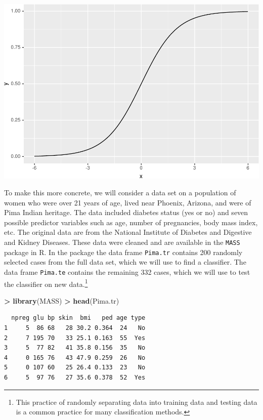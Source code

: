 \documentclass[]{krantz}
\makeatletter
\newenvironment{Shaded}{\begin{snugshade}}{\end{snugshade}}
\newcommand{\KeywordTok}[1]{\textcolor[rgb]{0.27,0.27,0.27}{\textbf{#1}}}
\newcommand{\NormalTok}[1]{#1}
\newcommand{\OperatorTok}[1]{\textcolor[rgb]{0.43,0.43,0.43}{\textbf{#1}}}
\newcommand{\StringTok}[1]{\textcolor[rgb]{0.5,0.5,0.5}{#1}}
\newenvironment{kframe}{%
\medskip{}
\setlength{\fboxsep}{.8em}
 \def\at@end@of@kframe{}%
 \ifinner\ifhmode%
  \def\at@end@of@kframe{\end{minipage}}%
  \begin{minipage}{\columnwidth}%
 \fi\fi%
 \def\FrameCommand##1{\hskip\@totalleftmargin \hskip-\fboxsep
 \colorbox{shadecolor}{##1}\hskip-\fboxsep
     \hskip-\linewidth \hskip-\@totalleftmargin \hskip\columnwidth}%
 \MakeFramed {\advance\hsize-\width
   \@totalleftmargin\z@ \linewidth\hsize
   \@setminipage}}%
 {\par\unskip\endMakeFramed%
 \at@end@of@kframe}
\renewenvironment{Shaded}{\begin{kframe}}{\end{kframe}}
\makeatother
\begin{document}
\includegraphics{bookdown_files/figure-latex/unnamed-chunk-218-1.pdf}

To make this more concrete, we will consider a data set on a population of women who were over 21 years of age, lived near Phoenix, Arizona, and were of Pima Indian heritage. The data included diabetes status (yes or no) and seven possible predictor variables such as age, number of pregnancies, body mass index, etc. The original data are from the National Institute of Diabetes and Digestive and Kidney Diseases. These data were cleaned and are available in the \texttt{MASS} package in R. In the package the data frame \texttt{Pima.tr} contains 200 randomly selected cases from the full data set, which we will use to find a classifier. The data frame \texttt{Pima.te} contains the remaining 332 cases, which we will use to test the classifier on new data.\footnote{This practice of randomly separating data into training data and testing data is a common practice for many classification methods.}

\begin{Shaded}
\begin{Highlighting}[]
\OperatorTok{>}\StringTok{ }\KeywordTok{library}\NormalTok{(MASS)}
\OperatorTok{>}\StringTok{ }\KeywordTok{head}\NormalTok{(Pima.tr)}
\end{Highlighting}
\end{Shaded}

\begin{verbatim}
  npreg glu bp skin  bmi   ped age type
1     5  86 68   28 30.2 0.364  24   No
2     7 195 70   33 25.1 0.163  55  Yes
3     5  77 82   41 35.8 0.156  35   No
4     0 165 76   43 47.9 0.259  26   No
5     0 107 60   25 26.4 0.133  23   No
6     5  97 76   27 35.6 0.378  52  Yes
\end{verbatim}
\end{document}
